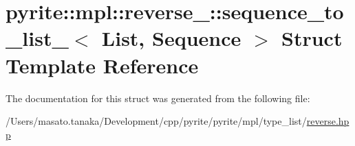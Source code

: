\hypertarget{structpyrite_1_1mpl_1_1reverse___1_1sequence__to__list__}{}\section{pyrite\+:\+:mpl\+:\+:reverse\+\_\+\+:\+:sequence\+\_\+to\+\_\+list\+\_\+$<$ List, Sequence $>$ Struct Template Reference}
\label{structpyrite_1_1mpl_1_1reverse___1_1sequence__to__list__}


The documentation for this struct was generated from the following file\+:\begin{DoxyCompactItemize}
\item 
/\+Users/masato.\+tanaka/\+Development/cpp/pyrite/pyrite/mpl/type\+\_\+list/\mbox{\hyperlink{reverse_8hpp}{reverse.\+hpp}}\end{DoxyCompactItemize}
